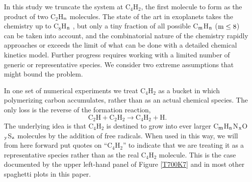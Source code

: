 \documentclass[preprint]{aastex6}
\newcounter{reaction}
\begin{document}
In this study we truncate the system at C$_4$H$_2$, the first molecule to form as the product of two C$_2$H$_{\rm n}$ molecules.
The state of the art in exoplanets takes the chemistry up to C$_8$H$_{\rm n}$ \citep{Moses2014,Venot2015,Rimmer2016}, but only a tiny fraction of all possible
C$_{\rm m}$H$_{\rm n}$ (${\rm m}\leq 8$) can be taken into account, and the combinatorial nature of the chemistry rapidly
approaches or exceeds the limit of what can be done with a detailed chemical kinetics model.
Further progress requires working with a limited number of generic or representative species.
We consider two extreme assumptions that might bound the problem.

In one set of numerical experiments we treat C$_4$H$_2$ as a bucket in which polymerizing
carbon accumulates, rather than as an actual chemical species.
The only loss is the reverse of the formation reaction,
\begin{equation}\tag{R57}
\mathrm{C}_2\mathrm{H} + \mathrm{C}_2\mathrm{H}_2 \rightarrow \mathrm{C}_4\mathrm{H}_2 + \mathrm{H}.
\end{equation} 
The underlying idea is that C$_4$H$_2$ is destined to grow into ever larger
C$_{\rm m}$H$_{\rm n}$N$_{\rm x}$O$_{\rm y}$S$_{\rm z}$ molecules by
the addition of free radicals.   
When used in this way, we will from here forward put quotes on ``C$_4$H$_2$'' to indicate that 
we are treating it as a representative species rather than as the real C$_4$H$_2$ molecule. 
This is the case documented by the upper left-hand panel of Figure \ref{T700K7} and in most other spaghetti plots in this paper.
 
\end{document}
